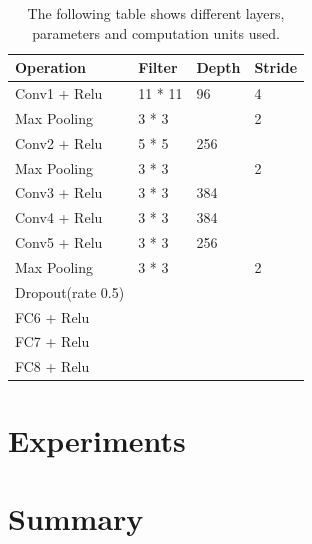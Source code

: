 \documentclass[12pt, a4paper,oneside]{report}
\begin{document}
	
\begin{table}[!htbp]
	\centering {} \small
	\label{table:2}
	\begin{adjustbox}{max width=1.1\textwidth,center}
		
		\begin{tabular}{|p{3cm}|p{3cm}|p{3cm}|p{3cm}|}
			\hline	
			Operation & Filter & Depth & Stride \\ \hline
			
			Conv1 + Relu  &  11 * 11  & 96  & 4 \\  \hline	 
			
			Max Pooling & 3 * 3  &  & 2 \\ \hline	   
			
			Conv2 + Relu & 5 * 5 & 256  &  \\ \hline	
			
			Max Pooling & 3 * 3 & & 2 \\ \hline
			
			Conv3 + Relu & 3 * 3 & 384 &  \\ \hline	
					
			
			Conv4 + Relu & 3 * 3  & 384  &  \\ \hline	
			
		    
		    Conv5 + Relu & 3 * 3  & 256 &  \\ \hline	
		    
		    Max Pooling & 3 * 3 & & 2 \\ \hline
		    
		    Dropout(rate 0.5) &  & & \\ \hline
		    
		    FC6 + Relu &  & & \\ \hline
		    
		    FC7 + Relu &  & & \\ \hline
		    
		    FC8 + Relu &  & & \\ \hline
		   
		\end{tabular}
	
	\end{adjustbox}

		\caption {The following table shows different layers, parameters and computation units used.}	
	
	
\end{table}












\chapter{Experiments}


\chapter{Summary}



\end{document}
